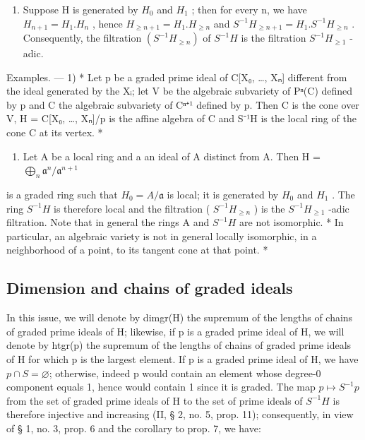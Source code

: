 \begin{enumerate}
\def\labelenumi{\arabic{enumi})}
\setcounter{enumi}{1}
\tightlist
\item
  Suppose H is generated by \(H_{0}\) and \(H_{1}\) ; then for every n, we have \(H_{n+1} = H_{1}.H_{n}\) , hence \(H_{\geqslant n+1} = H_{1}.H_{\geqslant n}\) and \(S^{-1}H_{\geqslant n+1} = H_{1}.S^{-1}H_{\geqslant n}\) . Consequently, the filtration \((S^{-1}H_{\geqslant n})\) of \(S^{-1}H\) is the filtration \(S^{-1}H_{\geqslant 1}\) -adic.
\end{enumerate}

Examples. --- 1) * Let p be a graded prime ideal of C{[}X₀, \ldots, Xₙ{]} different from the ideal generated by the Xᵢ; let V be the algebraic subvariety of Pⁿ(C) defined by p and C the algebraic subvariety of Cⁿ⁺¹ defined by p. Then C is the cone over V, H = C{[}X₀, \ldots, Xₙ{]}/p is the affine algebra of C and S⁻¹H is the local ring of the cone C at its vertex. *

\begin{enumerate}
\def\labelenumi{\arabic{enumi})}
\setcounter{enumi}{1}
\tightlist
\item
  Let A be a local ring and a an ideal of A distinct from A. Then H = \(\bigoplus_{n} \mathfrak{a}^{n}/\mathfrak{a}^{n+1}\)
\end{enumerate}

is a graded ring such that \(H_{0} = A/\mathfrak{a}\) is local; it is generated by \(H_{0}\) and \(H_{1}\) . The ring \(S^{-1}H\) is therefore local and the filtration ( \(S^{-1}H_{\geq n}\) ) is the \(S^{-1}H_{\geq 1}\) -adic filtration. Note that in general the rings A and \(S^{-1}H\) are not isomorphic. * In particular, an algebraic variety is not in general locally isomorphic, in a neighborhood of a point, to its tangent cone at that point. *

\subsection{Dimension and chains of graded ideals}

In this issue, we will denote by dimgr(H) the supremum of the lengths of chains of graded prime ideals of H; likewise, if p is a graded prime ideal of H, we will denote by htgr(p) the supremum of the lengths of chains of graded prime ideals of H for which p is the largest element. If p is a graded prime ideal of H, we have \(p \cap S = \varnothing\); otherwise, indeed p would contain an element whose degree-0 component equals 1, hence would contain 1 since it is graded. The map \(p \mapsto S^{-1}p\) from the set of graded prime ideals of H to the set of prime ideals of \(S^{-1}H\) is therefore injective and increasing (II, § 2, no. 5, prop. 11); consequently, in view of § 1, no. 3, prop. 6 and the corollary to prop. 7, we have:

